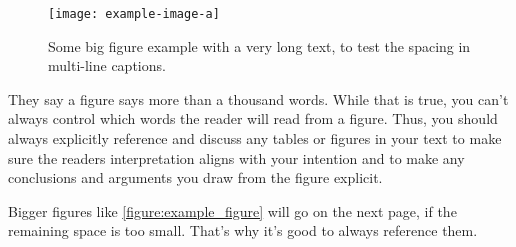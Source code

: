 \begin{figure}
    \centering
      \texttt{[image: example-image-a]}
      \caption{Some big figure example with a very long text, to test the spacing in multi-line captions.}
      \label{figure:example_figure}
    \end{figure}

They say a figure says more than a thousand words. While that is true, you can't always control which words the reader will read from a figure. Thus, you should always explicitly reference and discuss any tables or figures in your text to make sure the readers interpretation aligns with your intention and to make any conclusions and arguments you draw from the figure explicit.

Bigger figures like \autoref{figure:example_figure} will go on the next page, if the remaining space is too small. That's why it's good to always reference them.
